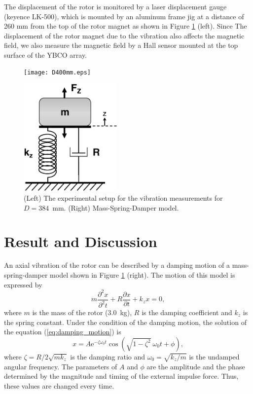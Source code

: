 \documentclass[a4paper]{jpconf}
\begin{document}
The displacement of the rotor is monitored by a laser displacement gauge (keyence LK-500),
which is mounted by an aluminum frame jig at a distance of 260 mm from the top of the rotor magnet as shown in Figure \ref{fig:d400} (left).
Since The displacement of the rotor magnet due to the vibration also affects the magnetic field,
we also measure the magnetic field by a Hall sensor mounted at the top surface of the YBCO array.

\begin{figure}[htbp]
  \centering
  \begin{minipage}{0.6\hsize}
    \texttt{[image: D400mm.eps]}
  \end{minipage}
  \begin{minipage}{0.3\hsize}
    \centering
    \includegraphics[width=50mm]{SpringSystem.eps}
  \end{minipage}
  \caption{(Left) The experimental setup for the vibration measurements for $D=384$~mm. (Right) Mass-Spring-Damper model.}
  \label{fig:d400}
\end{figure}


\section*{Result and Discussion}

An axial vibration of the rotor can be described by a damping motion of a mass-spring-damper model shown in Figure \ref{fig:d400} (right).
The motion of this model is expressed by
\begin{equation}
  m \frac{\partial^{2} x}{\partial^{2} t} + R \frac{\partial x}{\partial t} + k_{z} x = 0,
  \label{eq:damping_motion}
\end{equation}
where $m$ is the mass of the rotor (3.0~kg), $R$ is the damping coefficient and $k_{z}$ is the spring constant.
Under the condition of the damping motion, the solution of the equation (\ref{eq:damping_motion}) is
\begin{equation}
  x = A \mathrm{e}^{- \zeta \omega_{0} t} \cos( \sqrt{1 - \zeta^{2}} \ \omega_{0} t + \phi),
  \label{eq:damping}
\end{equation}
where $\zeta = R / 2 \sqrt{mk_{z}}$ is the damping ratio and $\omega_{0} = \sqrt{k_{z}/m}$ is the undamped angular frequency.
The parameters of $A$ and $\phi$ are the amplitude and the phase determined by the magnitude and timing of the external impulse force.
Thus, these values are changed every time.
\end{document}
